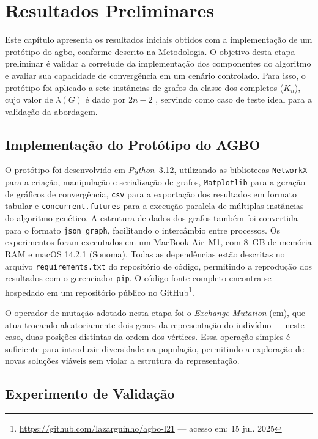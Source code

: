 \chapter{Resultados Preliminares}
\label{cap:resultados}

Este capítulo apresenta os resultados iniciais obtidos com a implementação de um protótipo do \gls{agbo}, conforme descrito na Metodologia. O objetivo desta etapa preliminar é validar a corretude da implementação dos componentes do algoritmo e avaliar sua capacidade de convergência em um cenário controlado. Para isso, o protótipo foi aplicado a sete instâncias de grafos da classe dos completos ($K_n$), cujo valor de $\lambda(G)$ é dado por $2n - 2$ \cite{griggs1992labelling}, servindo como caso de teste ideal para a validação da abordagem.

\section{Implementação do Protótipo do AGBO}

O protótipo foi desenvolvido em \textit{Python}~3.12, utilizando as bibliotecas \texttt{NetworkX} para a criação, manipulação e serialização de grafos, \texttt{Matplotlib} para a geração de gráficos de convergência, \texttt{csv} para a exportação dos resultados em formato tabular e \texttt{concurrent.futures} para a execução paralela de múltiplas instâncias do algoritmo genético. A estrutura de dados dos grafos também foi convertida para o formato \texttt{json\_graph}, facilitando o intercâmbio entre processos.  
Os experimentos foram executados em um MacBook Air~M1, com 8~GB de memória RAM
e macOS 14.2.1 (Sonoma).  
Todas as dependências estão descritas no arquivo \texttt{requirements.txt} do
repositório de código, permitindo a reprodução dos resultados com o gerenciador
\texttt{pip}. O código-fonte completo encontra-se hospedado em um repositório público no
GitHub\footnote{\url{https://github.com/lazarguinho/agbo-l21} — acesso em:
15 jul. 2025}.

O operador de mutação adotado nesta etapa foi o \textit{Exchange Mutation} (\gls{em}), que atua trocando aleatoriamente dois genes da representação do indivíduo — neste caso, duas posições distintas da ordem dos vértices. Essa operação simples é suficiente para introduzir diversidade na população, permitindo a exploração de novas soluções viáveis sem violar a estrutura da representação.

\section{Experimento de Validação}

